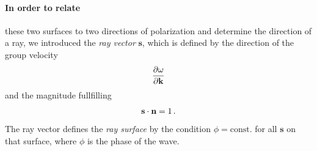 \paragraph{In order to relate} 
these two surfaces to two directions of polarization and 
determine the direction of a ray, we introduced the \emph{ray vector} $\mathbf{s}$, 
which is defined by the direction of the group velocity
\begin{equation}
    \frac{\partial \omega}{\partial \mathbf{k}}
\end{equation}
and the magnitude fullfilling 
\begin{equation}
    \mathbf{s} \cdot \mathbf{n} = 1\,.
\end{equation}
The ray vector defines the \emph{ray surface} by the condition 
$\phi = \mathrm{const.}$ 
for all $\mathbf{s}$ on that surface, where $\phi$ is the phase of the wave. 

